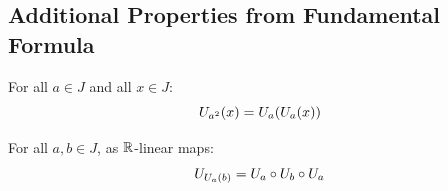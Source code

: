 \subsection{Additional Properties from Fundamental Formula}

\begin{theorem}
For all $a \in J$ and all $x \in J$:
\[ U_{a^{2}}(x) = U_{a}(U_{a}(x)) \]
\end{theorem}

\begin{theorem}
For all $a, b \in J$, as $\mathbb{R}$-linear maps:
\[ U_{U_{a}(b)} = U_{a} \circ U_{b} \circ U_{a} \]
\end{theorem}
